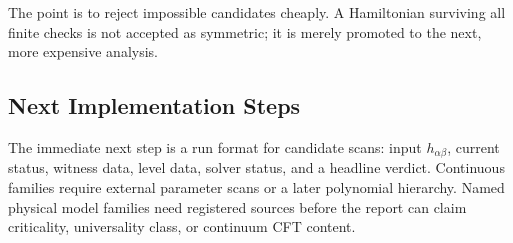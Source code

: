 The point is to reject impossible candidates cheaply.  A Hamiltonian surviving
all finite checks is not accepted as symmetric; it is merely promoted to the
next, more expensive analysis.

\subsection{Next Implementation Steps}

The immediate next step is a run format for candidate scans: input
\(h_{\alpha\beta}\), current status, witness data, level data, solver status,
and a headline verdict.  Continuous families require external parameter scans
or a later polynomial hierarchy.  Named physical model families need registered
sources before the report can claim criticality, universality class, or
continuum CFT content.

